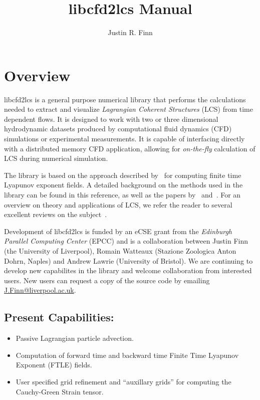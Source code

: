 \documentclass[letterpaper,11pt]{article}
\title{libcfd2lcs Manual}
\author{Justin R. Finn}
\begin{document}
\maketitle
\section{Overview}
libcfd2lcs is a general purpose numerical library that performs the calculations needed to extract and visualize \emph{Lagrangian Coherent Structures} (LCS) from time dependent flows.  It is designed to work with two or three dimensional hydrodynamic datasets produced by computational fluid dynamics (CFD) simulations or experimental measurements.  It is capable of interfacing directly with a distributed memory CFD application, allowing for \emph{on-the-fly} calculation of LCS during numerical simulation.

The library is based on the approach described by~\cite{finn2013integrated} for computing finite time Lyapunov exponent fields.  A detailed background on the methods used in the library can be found in this reference, as well as the papers by~\cite{brunton2010fast} and~\cite{leung2011eulerian}.  For an overview on theory and applications of LCS, we refer the reader to several excellent reviews on the subject~\cite{haller2015lagrangian,peacock2015introduction,peacock2010introduction,samelson2013lagrangian}.

Development of libcfd2lcs is funded by an eCSE grant from the \emph{Edinburgh Parallel Computing Center} (EPCC) and is a collaboration between Justin Finn (the University of Liverpool), Romain Watteaux (Stazione Zoologica Anton Dohrn, Naples) and Andrew Lawrie (University of Bristol).  We are continuing to develop new capabilites in the library and welcome collaboration from interested users.  New users can request a copy of the source code by emailing \href{mailto:J.Finn@liverpool.ac.uk}{J.Finn@liverpool.ac.uk}.
 
\subsection*{Present Capabilities:}
 \begin{itemize}
 \item Passive Lagrangian particle advection.
 \item Computation of forward time and backward time Finite Time Lyapunov Exponent (FTLE) fields.
 \item User specified grid refinement and ``auxillary grids'' for computing the Cauchy-Green Strain tensor. 
\end{itemize}
\end{document}
